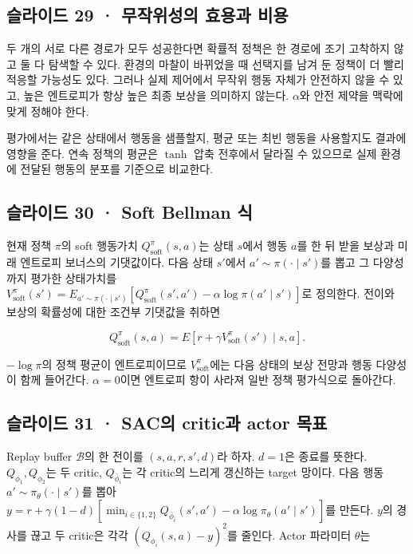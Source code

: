 \documentclass[11pt,a4paper]{article}
\begin{document}
\subsection{슬라이드 29 · 무작위성의 효용과 비용}

두 개의 서로 다른 경로가 모두 성공한다면 확률적 정책은 한 경로에 조기 고착하지 않고 둘 다 탐색할 수 있다. 환경의 마찰이 바뀌었을 때 선택지를 남겨 둔 정책이 더 빨리 적응할 가능성도 있다. 그러나 실제 제어에서 무작위 행동 자체가 안전하지 않을 수 있고, 높은 엔트로피가 항상 높은 최종 보상을 의미하지 않는다. $\alpha$와 안전 제약을 맥락에 맞게 정해야 한다.\par

평가에서는 같은 상태에서 행동을 샘플할지, 평균 또는 최빈 행동을 사용할지도 결과에 영향을 준다. 연속 정책의 평균은 $\tanh$ 압축 전후에서 달라질 수 있으므로 실제 환경에 전달된 행동의 분포를 기준으로 비교한다.\par

\subsection{슬라이드 30 · Soft Bellman 식}

현재 정책 $\pi$의 soft 행동가치 $Q^\pi_{\mathrm{soft}}(s,a)$는 상태 $s$에서 행동 $a$를 한 뒤 받을 보상과 미래 엔트로피 보너스의 기댓값이다. 다음 상태 $s'$에서 $a'\sim\pi(\cdot\mid s')$를 뽑고 그 다양성까지 평가한 상태가치를 $V^\pi_{\mathrm{soft}}(s')=E_{a'\sim\pi(\cdot\mid s')}[Q^\pi_{\mathrm{soft}}(s',a')-\alpha\log\pi(a'\mid s')]$로 정의한다. 전이와 보상의 확률성에 대한 조건부 기댓값을 취하면\par

\[
Q^\pi_{\mathrm{soft}}(s,a)
=E[r+\gamma V^\pi_{\mathrm{soft}}(s')\mid s,a].
\]

$-\log\pi$의 정책 평균이 엔트로피이므로 $V^\pi_{\mathrm{soft}}$에는 다음 상태의 보상 전망과 행동 다양성이 함께 들어간다. $\alpha=0$이면 엔트로피 항이 사라져 일반 정책 평가식으로 돌아간다.\par

\subsection{슬라이드 31 · SAC의 critic과 actor 목표}

Replay buffer $\mathcal B$의 한 전이를 $(s,a,r,s',d)$라 하자. $d=1$은 종료를 뜻한다. $Q_{\phi_1},Q_{\phi_2}$는 두 critic, $Q_{\bar\phi_i}$는 각 critic의 느리게 갱신하는 target 망이다. 다음 행동 $a'\sim\pi_\theta(\cdot\mid s')$를 뽑아 $y=r+\gamma(1-d)[\min_{i\in\{1,2\}}Q_{\bar\phi_i}(s',a')-\alpha\log\pi_\theta(a'\mid s')]$를 만든다. $y$의 경사를 끊고 두 critic은 각각 $(Q_{\phi_i}(s,a)-y)^2$를 줄인다. Actor 파라미터 $\theta$는\par
\end{document}
